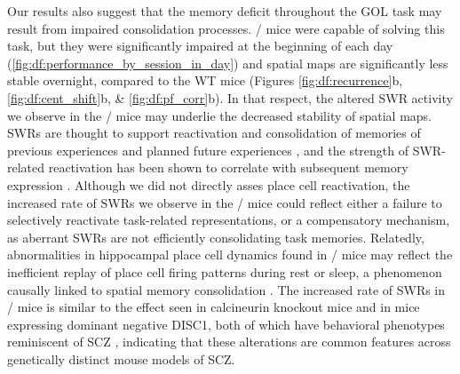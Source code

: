 Our results also suggest that the memory deficit throughout the GOL task may result from impaired consolidation processes. \df/ mice were capable of solving this task, but they were significantly impaired at the beginning of each day (\autoref{fig:df:performance_by_session_in_day}) and spatial maps are significantly less stable overnight, compared to the WT mice (Figures \ref{fig:df:recurrence}b, \ref{fig:df:cent_shift}b, \& \ref{fig:df:pf_corr}b). In that respect, the altered SWR activity we observe in the \df/ mice may underlie the decreased stability of spatial maps.  SWRs are thought to support reactivation and consolidation of memories of previous experiences and planned future experiences \citep{Buzsaki2015, Diba2007, Foster2006, Jadhav2012, Kudrimoti1999}, and the strength of SWR-related reactivation has been shown to correlate with subsequent memory expression \citep{Dupret2010a}. Although we did not directly asses place cell reactivation, the increased rate of SWRs we observe in the \df/ mice could reflect either a failure to selectively reactivate task-related representations, or a compensatory mechanism, as aberrant SWRs are not efficiently consolidating task memories. Relatedly, abnormalities in hippocampal place cell dynamics found in \df/ mice may reflect the inefficient replay of place cell firing patterns during rest or sleep, a phenomenon causally linked to spatial memory consolidation \citep{DeLavilleon2015}. The increased rate of SWRs in \df/ mice is similar to the effect seen in calcineurin knockout mice and in mice expressing dominant negative DISC1, both of which have behavioral phenotypes reminiscent of SCZ \citep{Altimus2015, Suh2013}, indicating that these alterations are common features across genetically distinct mouse models of SCZ.

